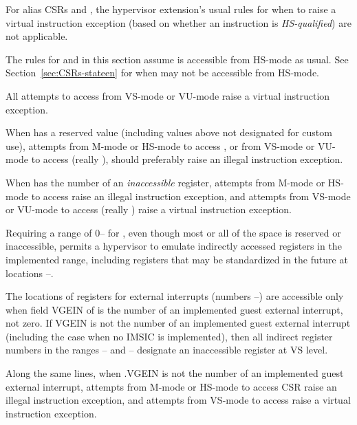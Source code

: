 For alias CSRs  and , the hypervisor extension's
usual rules for when to raise a virtual instruction exception (based
on whether an instruction is \emph{HS-qualified}) are not applicable.

The rules for  and  in this section assume
 is accessible from \mbox{HS-mode} as usual.
See Section~\ref{sec:CSRs-stateen} for when
 may not be accessible from \mbox{HS-mode}.

All attempts to access  from \mbox{VS-mode}
or \mbox{VU-mode} raise a virtual instruction exception.

When  has a reserved value (including values above
 not designated for custom use), attempts from \mbox{M-mode}
or \mbox{HS-mode} to access , or from \mbox{VS-mode}
or \mbox{VU-mode} to access  (really ),
should preferably raise an illegal instruction exception.

When  has the number of an \emph{inaccessible} register,
attempts from \mbox{M-mode} or \mbox{HS-mode} to access 
raise an illegal instruction exception, and attempts from
\mbox{VS-mode} or \mbox{VU-mode} to access 
(really ) raise a virtual instruction exception.

\begin{commentary}
Requiring a range of\/ {\rm 0}-- for , even
though most or all of the space is
reserved or inaccessible, permits a hypervisor
to emulate indirectly accessed registers in the implemented range,
including registers that may be standardized in the future at locations
--.
\end{commentary}

The locations of registers for external interrupts (numbers
--) are accessible only when field VGEIN of 
is the number of an implemented guest external interrupt, not zero.
If VGEIN is not the number of an implemented guest external interrupt
(including the case when no IMSIC is implemented), then all
indirect register numbers in the ranges -- and
-- designate an inaccessible register at VS level.

Along the same lines, when .VGEIN is not the number of
an implemented guest external interrupt, attempts from \mbox{M-mode}
or \mbox{HS-mode} to access CSR 
raise an illegal instruction exception,
and attempts from \mbox{VS-mode} to access  raise a
virtual instruction exception.

